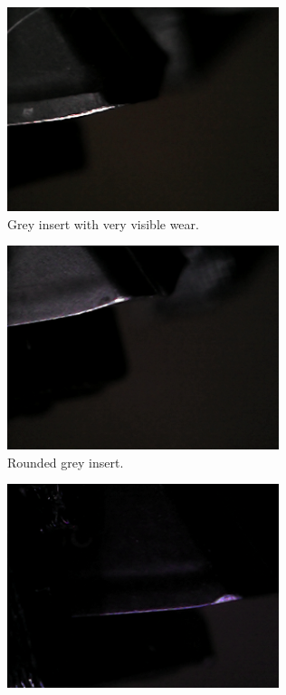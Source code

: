 \begin{figure}[hbtp]
	\centering
	\begin{subfigure}{0.49\textwidth}
		\includegraphics[width=3.125000in, keepaspectratio=true]{./fig/Vision/Dataset/automated_datasets/2_created_datasets/2_Spaghetti_dataset/gray_b_003_p_004_l_006-011_white_nb.png}
		\caption{Grey insert with very visible wear.}
	\end{subfigure}
	\hspace*{\fill}
	\begin{subfigure}{0.49\textwidth}
		\includegraphics[width=3.125000in, keepaspectratio=true]{./fig/Vision/Dataset/automated_datasets/2_created_datasets/2_Spaghetti_dataset/rounded_grey_b_011_p_008_l_006-011_white_nb.png}
		\caption{Rounded grey insert.}
	\end{subfigure}
	\hspace*{\fill}
	\begin{subfigure}{0.49\textwidth}
		\includegraphics[width=3.125000in, keepaspectratio=true]{./fig/Vision/Dataset/automated_datasets/2_created_datasets/2_Spaghetti_dataset/rounded_black_b_013_p_002_l_006-011_white_nb.png}

\end{subfigure}
\end{figure}
